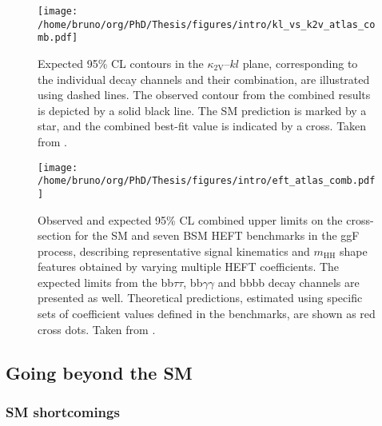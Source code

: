 \documentclass[11pt]{article}
\newcommand{\bbbb}{bbbb}
\newcommand{\bbgg}{bb$\gamma\gamma$}
\newcommand{\bbtt}{bb$\tau\tau$}
\newcommand{\kvv}{\kappa_{\text{2V}}}
\newcommand{\mhh}{m_{\text{HH}}}
\begin{document}
\begin{figure}
\texttt{[image: /home/bruno/org/PhD/Thesis/figures/intro/kl\_vs\_k2v\_atlas\_comb.pdf]}
\caption{\label{fig:kl_vs_k2v_atlas}Expected 95\% CL contours in the \(\kvv{}–kl{}\) plane, corresponding to the individual decay channels and their combination, are illustrated using dashed lines. The observed contour from the combined results is depicted by a solid black line. The \ac{SM} prediction is marked by a star, and the combined best-fit value is indicated by a cross. Taken from \cite{atlas_hh_comb}.}
\end{figure}

\begin{figure}
\texttt{[image: /home/bruno/org/PhD/Thesis/figures/intro/eft\_atlas\_comb.pdf]}
\caption{\label{fig:kl_vs_k2v_atlas}Observed and expected 95\% CL combined upper limits on the cross-section for the \ac{SM} and seven \ac{BSM} HEFT benchmarks in the ggF process, describing representative signal kinematics and \(\mhh\) shape features obtained by varying multiple \ac{HEFT} coefficients. The expected limits from the \bbtt{}, \bbgg{} and \bbbb{} decay channels are presented as well. Theoretical predictions, estimated using specific sets of coefficient values defined in the benchmarks, are shown as red cross dots. Taken from \cite{atlas_hh_comb}.}
\end{figure}
\subsection{Going beyond the SM}
\label{sec:orgb06aa25}
\subsubsection{SM shortcomings}
\label{sec:org0fd8c2c}
\label{sec:SMShortComings}
\end{document}
